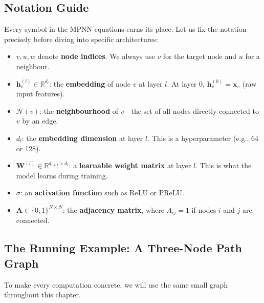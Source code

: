 \subsection{Notation Guide}

Every symbol in the MPNN equations earns its place. Let us fix the notation precisely before diving into specific architectures:

\begin{itemize}
    \item $v, u, w$ denote \textbf{node indices}. We always use $v$ for the target node and $u$ for a neighbour.
    \item $\mathbf{h}_v^{(l)} \in \mathbb{R}^{d_l}$: the \textbf{embedding} of node $v$ at layer $l$. At layer 0, $\mathbf{h}_v^{(0)} = \mathbf{x}_v$ (raw input features).
    \item $\mathcal{N}(v)$: the \textbf{neighbourhood} of $v$---the set of all nodes directly connected to $v$ by an edge.
    \item $d_l$: the \textbf{embedding dimension} at layer $l$. This is a hyperparameter (e.g., 64 or 128).
    \item $\mathbf{W}^{(l)} \in \mathbb{R}^{d_{l+1} \times d_l}$: a \textbf{learnable weight matrix} at layer $l$. This is what the model learns during training.
    \item $\sigma$: an \textbf{activation function} such as ReLU or PReLU.
    \item $\mathbf{A} \in \{0,1\}^{N \times N}$: the \textbf{adjacency matrix}, where $A_{ij} = 1$ if nodes $i$ and $j$ are connected.
\end{itemize}

\subsection{The Running Example: A Three-Node Path Graph}

To make every computation concrete, we will use the same small graph throughout this chapter.

